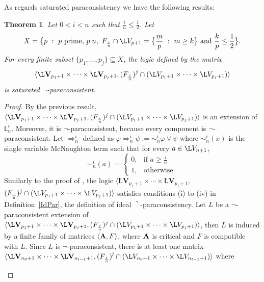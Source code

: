 \documentclass{article}
\newtheorem{theorem}{Theorem}
\theoremstyle{definition}
\newcommand{\algLfin}{\textbf{\L}\mathbf{V}}
\newcommand{\domLfin}{{\L}V}
\newcommand{\ninv}{\mathord{\sim}}
\begin{document}
As regards saturated paraconsistency we have the following results:

\begin{theorem} \label{teorX}
Let $0<i<n$ such that $\frac{i}{n}\leq\frac{1}{2}$. Let
$$X=\big\{p \ : \  p \mbox{ prime, } p|n,\   F_{\frac{i}{n}}\cap \domLfin_{p+1}= \big\{\frac{m}{p} \ : \ m\geq k\big\} \mbox{ and } \frac{k}{p}\leq\frac{1}{2}\big\}.$$
For every finite subset $\{p_{1},\ldots, p_{j}\}\subseteq X$, the logic defined by the matrix
$$\langle \algLfin_{p_{1}+1}\times\cdots\times\algLfin_{p_{j}+1}, (F_{\frac{i}{n}})^{j}\cap (\domLfin_{p_{1}+1}\times\cdots\times \domLfin_{p_{j}+1}) \rangle$$
is saturated $\neg$-paraconsistent.
\end{theorem}


\begin{proof}
By the previous result,$\langle \algLfin_{p_{1}+1}\times\cdots\times\algLfin_{p_{j}+1}, (F_{\frac{i}{n}})^{j}\cap (\domLfin_{p_{1}+1}\times\cdots\times \domLfin_{p_{j}+1}) \rangle$ is an extension of $\mathsf{L}_{n}^{i}$. Moreover, it is $\neg$-paraconsistent, because every component is $\neg$-paraconsistent. Let $\Rightarrow^{i}_{n}$ defined as $\varphi\Rightarrow^{i}_{n}\psi:=\ninv^{i}_{n}\varphi \lor \psi$ where $\ninv^{i}_{n}(x)$ is the single variable McNaughton term such that for every $a\in \domLfin_{n+1}$,
$$
\ninv^{i}_{n}(a)  = \left \{
\begin{array}{ll}
0, & \mbox{if } a\geq \frac{i}{n} \\
1, & \mbox{otherwise}.
\end{array}
\right .
$$  Similarly to the proof of \cite[Proposition 6.2]{CoEsGiGo}, the logic $\langle \algLfin_{p_{1}+1}\times\cdots\times\algLfin_{p_{j}+1},$ \\ $ (F_{\frac{i}{n}})^{j}\cap (\domLfin_{p_{1}+1}\times\cdots\times \domLfin_{p_{j}+1})\rangle$ satisfies  conditions (i) to (iv) in  Definition~\ref{IdPar}, the definition of ideal $\urcorner$-paraconsistency. Let $L$ be a $\neg$-paraconsistent extension of $\langle \algLfin_{p_{1}+1}\times\cdots\times\algLfin_{p_{j}+1}, (F_{\frac{i}{n}})^{j}\cap (\domLfin_{p_{1}+1}\times\cdots\times \domLfin_{p_{j}+1}) \rangle$, then $L$ is induced by a finite family of matrices $\langle {\bf A}, F\rangle$, where $\bf A$ is critical and $F$ is compatible with $L$. Since $L$ is $\neg$-paraconsistent, there is at least one matrix $\langle \algLfin_{n_{0}+1}\times\cdots\times\algLfin_{n_{l-1}+1}, (F_{\frac{i}{n}})^{l}\cap (\domLfin_{n_{0}+1}\times\cdots\times \domLfin_{n_{l-1}+1})\rangle$ where
\begin{enumerate}

\end{enumerate}
\end{proof}
\end{document}
